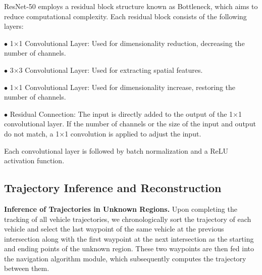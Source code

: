 \documentclass[lettersize,journal]{IEEEtran}
\begin{document}
ResNet-50 employs a residual block structure known as Bottleneck, which aims to reduce computational complexity. 
Each residual block consists of the following layers:

\(\bullet\) 1\(\times\)1 Convolutional Layer: Used for dimensionality reduction, decreasing the number of channels.

\(\bullet\) 3\(\times\)3 Convolutional Layer: Used for extracting spatial features.

\(\bullet\) 1\(\times\)1 Convolutional Layer: Used for dimensionality increase, restoring the number of channels.

\(\bullet\) Residual Connection: The input is directly added to the output of the 1\(\times\)1 convolutional layer. 
If the number of channels or the size of the input and output do not match, a 1\(\times\)1 convolution is applied to adjust the input.

Each convolutional layer is followed by batch normalization and a ReLU activation function.

\subsection{Trajectory Inference and Reconstruction}

\textbf{Inference of Trajectories in Unknown Regions.}
Upon completing the tracking of all vehicle trajectories, we chronologically sort the trajectory of each vehicle and select the last waypoint of the same vehicle at the previous intersection along with the first waypoint at the next intersection as the starting and ending points of the unknown region. 
These two waypoints are then fed into the navigation algorithm module, which subsequently computes the trajectory between them.
\end{document}

